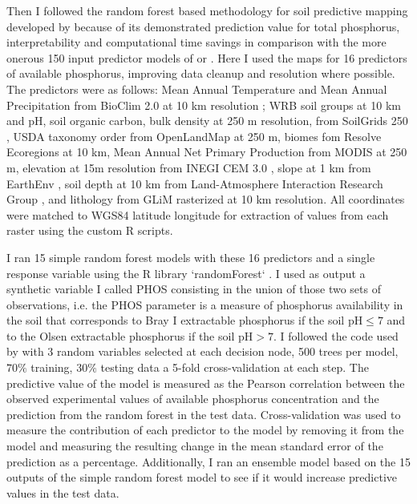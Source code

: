Then I followed the random forest based methodology for soil predictive mapping developed by \citep{hexianjin2022} because of its demonstrated prediction value for total phosphorus, interpretability and computational time savings in comparison with the more onerous 150 input predictor models of \citep{hengl2019} or \citep{mcdowell2023}. 
Here I used the maps for 16 predictors of available phosphorus, improving data cleanup and resolution where possible.
The predictors were as follows: Mean Annual Temperature and Mean Annual Precipitation from BioClim 2.0 at 10 km resolution \citep{fick2017}; WRB soil groups at 10 km and pH, soil organic carbon, bulk density at 250 m resolution, from SoilGrids 250 \citep{hengl2019,hengl2017,wrb2022,scheffe2015}, USDA taxonomy order from OpenLandMap at 250 m, biomes fom Resolve Ecoregions \citep{dinerstein2017} at 10 km, Mean Annual Net Primary Production from MODIS \citep{running2015a} at 250 m, elevation at 15m resolution from INEGI CEM 3.0 \citep{inegi2019}, slope at 1 km from EarthEnv \citep{amatulli2018}, soil depth at 10 km from Land-Atmosphere Interaction Research Group \citep{shangguan2017}, and lithology from GLiM rasterized at 10 km resolution\citep{hartmann2012}.
All coordinates were matched to WGS84 latitude longitude for extraction of values from each raster using the custom R scripts.

I ran 15 simple random forest models with these 16 predictors and a single response variable using the R library `randomForest` \citep{liaw2002}. 
I used as output a synthetic variable I called PHOS consisting in the union of those two sets of observations, i.e. the PHOS parameter is a measure of phosphorus availability in the soil that corresponds to Bray I extractable phosphorus if the soil $\text{pH} \leq 7$ and to the Olsen extractable phosphorus if the soil $\text{pH} > 7$. 
I followed the code used by \citep{hexianjin2022}  with 3 random variables selected at each decision node, 500 trees per model, $70\%$ training, $30\%$ testing data a 5-fold cross-validation at each step.
The predictive value of the model is measured as the Pearson correlation between the observed experimental values of available phosphorus concentration and the prediction from the random forest in the test data. 
Cross-validation was used to measure the contribution of each predictor to the model by removing it from the model and measuring the resulting change in the mean standard error of the prediction as a percentage. 
Additionally, I ran an ensemble model based on the 15 outputs of the simple random forest model to see if it would increase predictive values in the test data.

